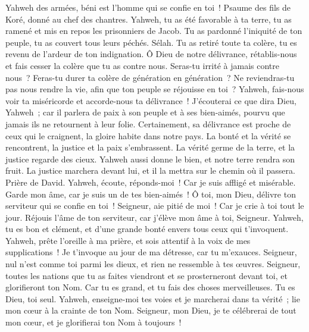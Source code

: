 \begin{multicols}{2}
Yahweh des armées, béni est l'homme qui se confie en toi~!
\VerseOne{}Psaume des fils de Koré, donné au chef des chantres.
Yahweh, tu as été favorable à ta terre, tu as ramené et mis en repos les prisonniers de Jacob.
Tu as pardonné l'iniquité de ton peuple, tu as couvert tous leurs péchés. Sélah.
Tu as retiré toute ta colère, tu es revenu de l'ardeur de ton indignation.
Ô Dieu de notre délivrance, rétablis-nous et fais cesser la colère que tu as contre nous.
Seras-tu irrité à jamais contre nous~? Feras-tu durer ta colère de génération en génération~?
Ne reviendras-tu pas nous rendre la vie, afin que ton peuple se réjouisse en toi~?
Yahweh, fais-nous voir ta miséricorde et accorde-nous ta délivrance~!
J'écouterai ce que dira Dieu, Yahweh~; car il parlera de paix à son peuple et à ses bien-aimés, pourvu que jamais ils ne retournent à leur folie.
Certainement, sa délivrance est proche de ceux qui le craignent, la gloire habite dans notre pays.
La bonté et la vérité se rencontrent, la justice et la paix s'embrassent.
La vérité germe de la terre, et la justice regarde des cieux.
Yahweh aussi donne le bien, et notre terre rendra son fruit.
La justice marchera devant lui, et il la mettra sur le chemin où il passera.
\VerseOne{}Prière de David. Yahweh, écoute, réponds-moi~! Car je suis affligé et misérable.
Garde mon âme, car je suis un de tes bien-aimés~! Ô toi, mon Dieu, délivre ton serviteur qui se confie en toi~!
Seigneur, aie pitié de moi~! Car je crie à toi tout le jour.
Réjouis l'âme de ton serviteur, car j'élève mon âme à toi, Seigneur.
Yahweh, tu es bon et clément, et d'une grande bonté envers tous ceux qui t'invoquent.
Yahweh, prête l'oreille à ma prière, et sois attentif à la voix de mes supplications~!
Je t'invoque au jour de ma détresse, car tu m'exauces.
Seigneur, nul n'est comme toi parmi les dieux, et rien ne ressemble à tes œuvres.
Seigneur, toutes les nations que tu as faites viendront et se prosterneront devant toi, et glorifieront ton Nom.
Car tu es grand, et tu fais des choses merveilleuses. Tu es Dieu, toi seul.
Yahweh, enseigne-moi tes voies et je marcherai dans ta vérité~; lie mon cœur à la crainte de ton Nom.
Seigneur, mon Dieu, je te célébrerai de tout mon cœur, et je glorifierai ton Nom à toujours~!

\end{multicols}
